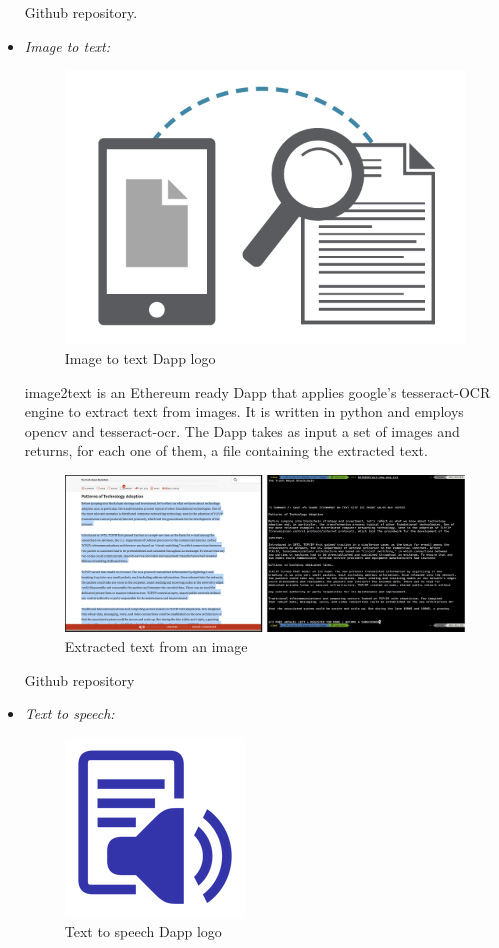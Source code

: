 \begin{itemize}
        Github repository\cite{object-detector}.

        \clearpage

        \item \textit{Image to text: }

        \begin{figure}[!h]\centering
            \includegraphics[width=.3\columnwidth]{6-Implementation/figs/image-to-text-logo.png}
            \caption{Image to text Dapp logo}
        \end{figure}

        \vspace{50px}

        image2text is an Ethereum ready Dapp that applies google's tesseract-OCR engine to extract
        text from images. It is written in python and employs opencv and tesseract-ocr. The Dapp takes as
        input a set of images and returns, for each one of them, a file containing the extracted text.

        \vspace{50px}

        \begin{figure}[!h]\centering
            \includegraphics[width=\columnwidth]{6-Implementation/figs/image-to-text-exp.png}
            \caption{Extracted text from an image}
        \end{figure}

        Github repository\cite{image-to-text}

        \clearpage

        \item \textit{Text to speech: }

        \begin{figure}[!h]\centering
            \includegraphics[width=.2\columnwidth]{6-Implementation/figs/text-to-speech-logo.png}
            \caption{Text to speech Dapp logo}
        \end{figure}


\end{itemize}
